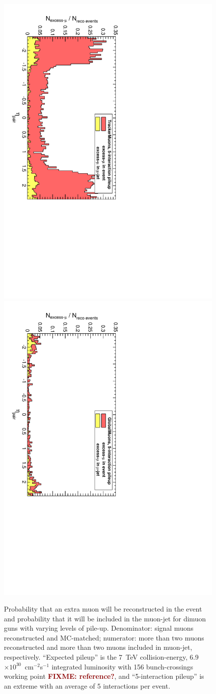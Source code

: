 \documentclass[12pt]{article}
\newcommand{\fixme}[1]{\textcolor{darkred}{\bf FIXME: #1}}
\begin{document}
\begin{figure}[p]
\includegraphics[height=0.5\linewidth, angle=90]{fig/acceptance4_plot/toomanymuons_TrackerMuonsGroupByMassAndVertexProbOrDeltaR_pileup5.pdf}
\includegraphics[height=0.5\linewidth, angle=90]{fig/acceptance4_plot/toomanymuons_GlobalMuonsGroupByMassAndVertexProbOrDeltaR_pileup5.pdf}

\caption{Probability that an extra muon will be reconstructed in the
  event and probability that it will be included in the muon-jet for
  dimuon guns with varying levels of pile-up.  Denominator: signal
  muons reconstructed and MC-matched; numerator: more than two muons
  reconstructed and more than two muons included in muon-jet,
  respectively.  ``Expected pileup'' is the 7~TeV collision-energy,
  6.9$\times 10^{30}$~cm$^{-2}$s$^{-1}$ integrated luminosity with
  156 bunch-crossings working point \fixme{reference?}, and ``5-interaction
  pileup'' is an extreme with an average of 5 interactions per
  event.  \label{fig:toomanymuons}}
\end{figure}
\end{document}
